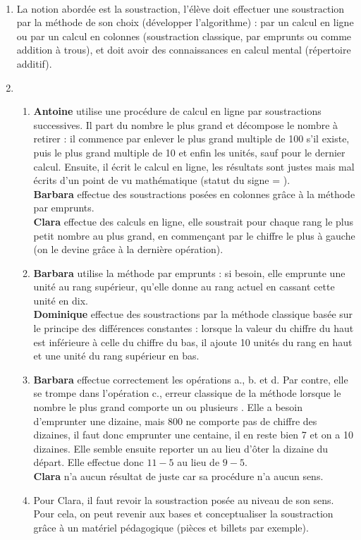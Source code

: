 \ \\ [-5mm]
\begin{enumerate}
   \item La notion abordée est la soustraction, l'élève doit effectuer une soustraction par la méthode de son choix (développer l'algorithme) : par un calcul en ligne ou par un calcul en colonnes (soustraction classique, par emprunts ou comme addition à trous), et doit avoir des connaissances en calcul mental (répertoire additif).  \item
   \begin{enumerate}
      \item {\bf Antoine} utilise une procédure de calcul en ligne par soustractions successives. Il part du nombre le plus grand et décompose le nombre à retirer : il commence par enlever le plus grand multiple de 100 s'il existe, puis le plus grand multiple de 10 et enfin les unités, sauf pour le dernier calcul. Ensuite, il écrit le calcul en ligne, les résultats sont justes mais mal écrits d'un point de vu mathématique (statut du signe \og = \fg).\\
      {\bf Barbara} effectue des soustractions posées en colonnes grâce à la méthode par emprunts. \\
      {\bf Clara} effectue des calculs en ligne, elle soustrait pour chaque rang le plus petit nombre au plus grand, en commençant par le chiffre le plus à gauche (on le devine grâce à la dernière opération).
      \item {\bf Barbara} utilise la méthode par emprunts : si besoin, elle emprunte une unité au rang supérieur, qu'elle donne au rang actuel en cassant cette unité en dix. \\
      {\bf Dominique} effectue des soustractions par la méthode classique basée sur le principe des différences constantes : lorsque la valeur du chiffre du haut est inférieure à celle du chiffre du bas, il ajoute 10 unités du rang en haut et une unité du rang supérieur en bas.
      \item {\bf Barbara} effectue correctement les opérations a., b. et d. Par contre, elle se trompe dans l'opération c., erreur classique de la méthode lorsque le nombre le plus grand comporte un ou plusieurs  \fg. Elle a besoin d'emprunter une dizaine, mais 800 ne comporte pas de chiffre des dizaines, il faut donc emprunter une centaine, il en reste bien 7 et on a 10 dizaines. Elle semble ensuite reporter un  \fg{} au lieu d'ôter la dizaine du départ. Elle effectue donc $11-5$ au lieu de $9-5$. \\
      {\bf Clara} n'a aucun résultat de juste car sa procédure n'a aucun sens.
      \item Pour Clara, il faut revoir la soustraction posée au niveau de son sens. Pour cela, on peut revenir aux bases et conceptualiser la soustraction grâce à un matériel pédagogique (pièces et billets par exemple).
   \end{enumerate}
\end{enumerate}
